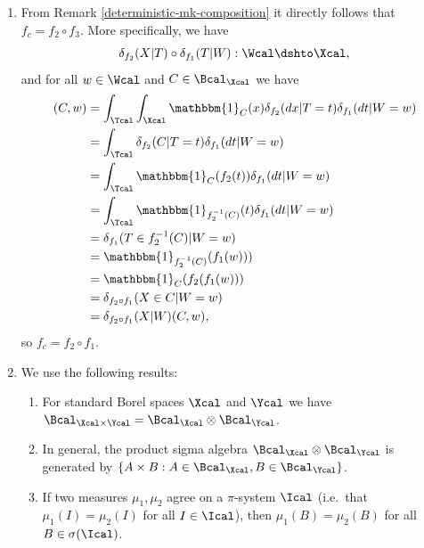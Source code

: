 \begin{enumerate}[label=3.\arabic*]
    \begin{ungradedsolution}
        \begin{enumerate}
            \item From Remark \ref*{deterministic-mk-composition} it directly follows that $f_c = f_2 \circ f_3$. More specifically, we have
            $$\delta_{f_2}(X|T)\circ \delta_{f_1}(T|W) : \Wcal \dshto \Xcal,$$ and for all $w\in \Wcal$ and $C\in \Bcal_{\Xcal}$ we have
            \begin{align*}
                [\delta_{f_2}(X|T)\circ \delta_{f_1}(T|W)](C, w)
                 & = \int_\Tcal\int_\Xcal \mathbbm{1}_C(x)\delta_{f_2}(dx|T=t)\delta_{f_1}(dt|W=w) \\
                 & = \int_\Tcal \delta_{f_2}(C|T=t)\delta_{f_1}(dt|W=w)                            \\
                 & = \int_\Tcal \mathbbm{1}_C(f_2(t))\delta_{f_1}(dt|W=w)                          \\
                 & = \int_\Tcal \mathbbm{1}_{f_2^{-1}(C)}(t)\delta_{f_1}(dt|W=w)                   \\
                 & = \delta_{f_1}(T\in f_2^{-1}(C)|W=w)                                            \\
                 & = \mathbbm{1}_{f_2^{-1}(C)}(f_1(w)))                                            \\
                 & = \mathbbm{1}_C(f_2(f_1(w)))                                                    \\
                 & = \delta_{f_2\circ f_1}(X\in C|W=w)                                             \\
                 & = \delta_{f_2\circ f_1}(X|W)(C, w),
            \end{align*}
            so $f_c = f_2\circ f_1$.
            \item We use the following results:
            \begin{enumerate}
                \item
                For standard Borel spaces $\Xcal$ and $\Ycal$ we have $\Bcal_{\Xcal\times \Ycal} = \Bcal_\Xcal \otimes \Bcal_\Ycal$.
                \item In general, the product sigma algebra $\Bcal_\Xcal \otimes \Bcal_\Ycal$ is generated by $\{A\times B: A\in\Bcal_\Xcal , B\in \Bcal_\Ycal\}$.
                \item If two measures $\mu_1, \mu_2$ agree on a $\pi$-system $\Ical$ (i.e.\ that $\mu_1(I) = \mu_2(I)$ for all $I\in\Ical$), then $\mu_1(B)=\mu_2(B)$ for all $B\in\sigma(\Ical)$.

\end{enumerate}
\end{enumerate}
\end{ungradedsolution}
\end{enumerate}

